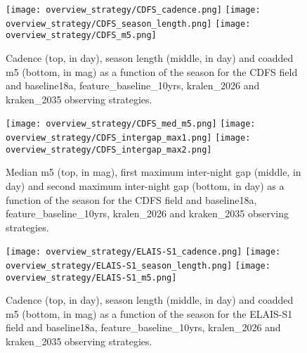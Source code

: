 

\begin{figure}[htbp]
\begin{center}
  \texttt{[image: overview\_strategy/CDFS\_cadence.png]}
  \texttt{[image: overview\_strategy/CDFS\_season\_length.png]}
  \texttt{[image: overview\_strategy/CDFS\_m5.png]}
 \caption{Cadence (top, in day), season length (middle, in day) and coadded m5 (bottom, in mag) as a function of the season for the CDFS field and baseline18a, feature\_baseline\_10yrs, kralen\_2026 and kraken\_2035 observing strategies.}\label{fig:cdfs_cad}
\end{center}
\end{figure}

\begin{figure}[htbp]
\begin{center}
  
  \texttt{[image: overview\_strategy/CDFS\_med\_m5.png]}
  \texttt{[image: overview\_strategy/CDFS\_intergap\_max1.png]}
    \texttt{[image: overview\_strategy/CDFS\_intergap\_max2.png]}
 \caption{Median m5 (top, in mag), first maximum inter-night gap (middle, in day) and second maximum inter-night gap (bottom, in day)  as a function of the season for the CDFS field and baseline18a, feature\_baseline\_10yrs, kralen\_2026 and kraken\_2035 observing strategies.}\label{fig:cdfs_m5}
\end{center}
\end{figure}




\begin{figure}[htbp]
\begin{center}
  \texttt{[image: overview\_strategy/ELAIS-S1\_cadence.png]}
  \texttt{[image: overview\_strategy/ELAIS-S1\_season\_length.png]}
  \texttt{[image: overview\_strategy/ELAIS-S1\_m5.png]}
 \caption{Cadence (top, in day), season length (middle, in day) and coadded m5 (bottom, in mag) as a function of the season for the ELAIS-S1 field and baseline18a, feature\_baseline\_10yrs, kralen\_2026 and kraken\_2035 observing strategies.}\label{fig:elais-s1_cad}
\end{center}
\end{figure}

